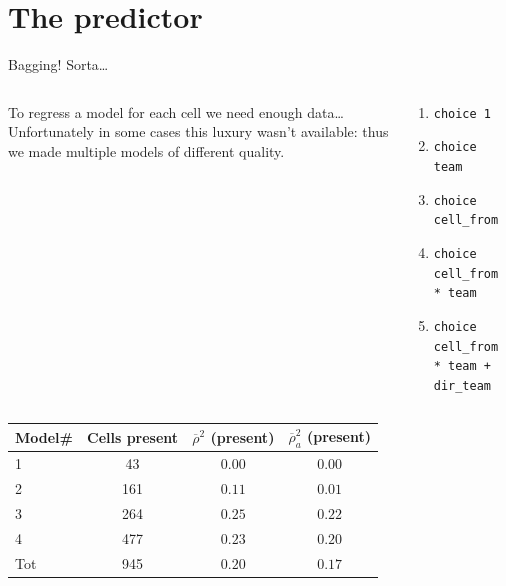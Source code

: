 \documentclass[english]{beamer}
\begin{document}
\section{The predictor}
\begin{frame}{Bagging! Sorta\dots}

  \begin{columns}
    \begin{column}{0.5\textwidth}
      To regress a model for each cell we need enough data\dots Unfortunately in some cases this luxury wasn't available: thus we made multiple models of different quality.
    \end{column}
    \begin{column}{0.5\textwidth}
      \begin{enumerate}
        \item \texttt{choice \raisebox{-0.3ex}{\textasciitilde} 1}
        \item \texttt{choice \raisebox{-0.3ex}{\textasciitilde} team}
        \item \texttt{choice \raisebox{-0.3ex}{\textasciitilde} cell\_from}
        \item \texttt{choice \raisebox{-0.3ex}{\textasciitilde} cell\_from * team}
        \item \texttt{choice \raisebox{-0.3ex}{\textasciitilde} cell\_from * team + dir\_team}
      \end{enumerate}
    \end{column}
  \end{columns}

  \begin{center}
    \begin{tabular} {l c c c}
        Model\# & Cells present & $\overline{\rho}^2$ (present) & $\overline{\rho}^2_a$ (present)\\
        \hline
        1 & 43 & $0.00$ & $0.00$\\
        2 & 161 & $0.11$ & $0.01$\\
        3 & 264 & $0.25$ & $0.22$\\
        4 & 477 & $0.23$ & $0.20$\\
        \hline
        Tot & 945 & $0.20$ & $0.17$
    \end{tabular}
  \end{center}
\end{frame}
\end{document}
